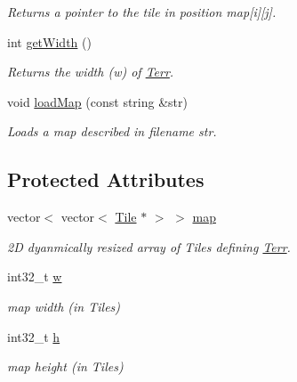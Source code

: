 \begin{DoxyCompactItemize}
\begin{DoxyCompactList}\small\item\em Returns a pointer to the tile in position map\mbox{[}i\mbox{]}\mbox{[}j\mbox{]}. \end{DoxyCompactList}\item 
int \hyperlink{class_terr_a397fdbbeb3fe3eb8989d9da77af42f57}{get\+Width} ()\hypertarget{class_terr_a397fdbbeb3fe3eb8989d9da77af42f57}{}\label{class_terr_a397fdbbeb3fe3eb8989d9da77af42f57}

\begin{DoxyCompactList}\small\item\em Returns the width (w) of \hyperlink{class_terr}{Terr}. \end{DoxyCompactList}\item 
void \hyperlink{class_terr_af53f4fdf0e1605b1536bde8c3fb77c9d}{load\+Map} (const string \&str)\hypertarget{class_terr_af53f4fdf0e1605b1536bde8c3fb77c9d}{}\label{class_terr_af53f4fdf0e1605b1536bde8c3fb77c9d}

\begin{DoxyCompactList}\small\item\em Loads a map described in filename str. \end{DoxyCompactList}\end{DoxyCompactItemize}
\subsection*{Protected Attributes}
\begin{DoxyCompactItemize}
\item 
vector$<$ vector$<$ \hyperlink{class_tile}{Tile} $\ast$ $>$ $>$ \hyperlink{class_terr_a35de374972704b3d92e76b4bc8e67a9c}{map}\hypertarget{class_terr_a35de374972704b3d92e76b4bc8e67a9c}{}\label{class_terr_a35de374972704b3d92e76b4bc8e67a9c}

\begin{DoxyCompactList}\small\item\em 2D dyanmically resized array of Tiles defining \hyperlink{class_terr}{Terr}. \end{DoxyCompactList}\item 
int32\+\_\+t \hyperlink{class_terr_aa5b7180529bfccda59cacab949dd5fce}{w}\hypertarget{class_terr_aa5b7180529bfccda59cacab949dd5fce}{}\label{class_terr_aa5b7180529bfccda59cacab949dd5fce}

\begin{DoxyCompactList}\small\item\em map width (in Tiles) \end{DoxyCompactList}\item 
int32\+\_\+t \hyperlink{class_terr_a577c745cd566dffc023befc91e427a8d}{h}\hypertarget{class_terr_a577c745cd566dffc023befc91e427a8d}{}\label{class_terr_a577c745cd566dffc023befc91e427a8d}

\begin{DoxyCompactList}\small\item\em map height (in Tiles) \end{DoxyCompactList}\end{DoxyCompactItemize}



